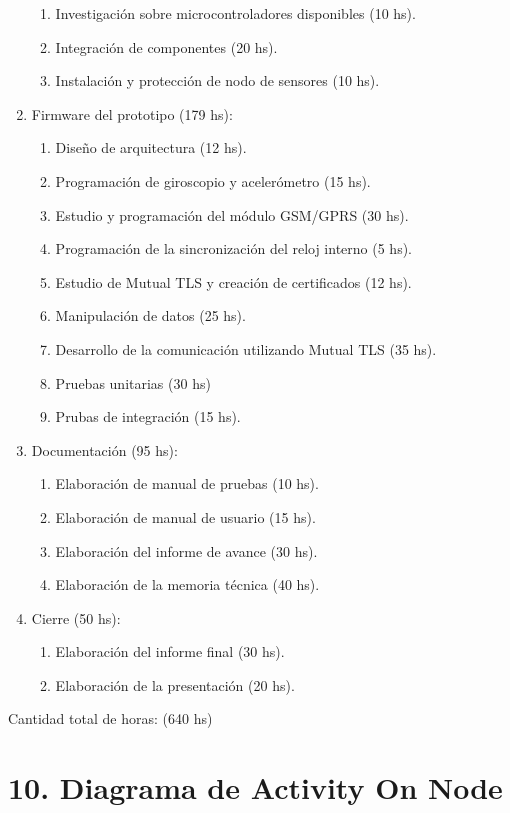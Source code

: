 \documentclass[
11pt, %
codirector, %
]{charter}
\begin{document}
\begin{enumerate}
\begin{enumerate}
		\item Investigación sobre microcontroladores disponibles (10 hs).
		\item Integración de componentes (20 hs).		
		\item Instalación y protección de nodo de sensores (10 hs).
	\end{enumerate}
\item Firmware del prototipo (179 hs):
	\begin{enumerate}
		\item Diseño de arquitectura (12 hs).
		\item Programación de giroscopio y acelerómetro (15 hs).		
		\item Estudio y programación del módulo GSM/GPRS (30 hs).
		\item Programación de la sincronización del reloj interno (5 hs).
		\item Estudio de Mutual TLS y creación de certificados (12 hs).
		\item Manipulación de datos (25 hs).
		\item Desarrollo de la comunicación utilizando Mutual TLS (35 hs).
		\item Pruebas unitarias (30 hs)
		\item Prubas de integración (15 hs).
	\end{enumerate}
\item Documentación (95 hs):
	\begin{enumerate}
		\item Elaboración de manual de pruebas (10 hs).
		\item Elaboración de manual de usuario (15 hs).
		\item Elaboración del informe de avance (30 hs).		
		\item Elaboración de la memoria técnica (40 hs).
	\end{enumerate}
\item Cierre (50 hs):
	\begin{enumerate}
		\item Elaboración del informe final (30 hs).	
		\item Elaboración de la presentación (20 hs).
	\end{enumerate}
\end{enumerate}

Cantidad total de horas: (640 hs)

\section{10. Diagrama de Activity On Node}
\label{sec:AoN}
\end{document}

